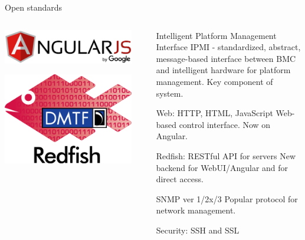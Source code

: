 \documentclass{beamer}
\begin{document}
\begin{frame}{Open standards}
\begin{columns}[onlytextwidth]
\begin{column}{0.2\textwidth}
				\includegraphics[width=\textwidth]{logo/angular.png}
				
				\includegraphics[width=\textwidth]{logo/redfish.jpg}
			\end{column}

			\begin{column}{0.1\textwidth}
			\end{column}

			\begin{column}{0.7\textwidth}
			\begin{block}{Intelligent Platform Management Interface}
				IPMI - standardized, abstract, message-based interface between BMC and intelligent hardware for platform management.
				Key component of system.
			\end{block}
			\pause

			\begin{block}{Web: HTTP, HTML, JavaScript}
				Web-based control interface. Now on Angular.
			\end{block}
			\pause
			
			\begin{block}{Redfish: RESTful API for servers}
				New backend for WebUI/Angular and for direct access.
			\end{block}
			\pause

			\begin{block}{SNMP ver 1/2x/3}
				Popular protocol for network management.
			\end{block}
			\pause

			\begin{block}{Security: SSH and SSL}
			\end{block}
			\end{column}

		\end{columns}
	\end{frame}
  
\end{document}
